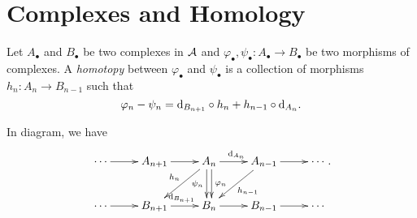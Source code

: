 \section{Complexes and Homology}

    \begin{definition}\label{def: homotopy between morphisms of complexes}
        Let \(A_\bullet\) and \(B_\bullet\) be two complexes in \({\mathcal{A}}\) and \(\varphi_\bullet, \psi_\bullet: A_\bullet \to B_\bullet\) be two morphisms of complexes.
        A \emph{homotopy} between \(\varphi_\bullet\) and \(\psi_\bullet\) is a collection of morphisms \(h_n: A_n \to B_{n-1}\) such that
        \[
            \varphi_n - \psi_n = {\mathrm{d}}_{B_{n+1}} \circ h_n + h_{n-1} \circ {\mathrm{d}}_{A_n}.
        \]
    \end{definition}

    In diagram, we have 
    \[ \xymatrix{
        \cdots \ar[r] & A_{n+1} \ar[r] & A_n \ar[r]^{\d_{A_{n}}} \ar[ld]_{h_n} \ar@<0.5ex>[d]^{\varphi_n} \ar@<-0.5ex>[d]_{\psi_n} & A_{n-1} \ar[ld]^{h_{n-1}} \ar[r] & \cdots \\
        \cdots \ar[r] & B_{n+1} \ar[r]^{\d_{B_{n+1}}} & B_n \ar[r]  & B_{n-1} \ar[r] & \cdots \\
    }. \]